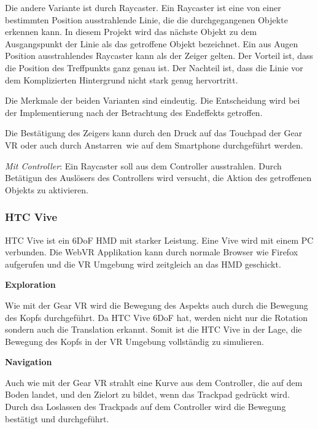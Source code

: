   Die andere Variante ist durch Raycaster. Ein Raycaster ist eine von einer bestimmten Position ausstrahlende Linie, die die durchgegangenen Objekte erkennen kann. In diesem Projekt wird das nächste Objekt zu dem Ausgangspunkt der Linie als das getroffene Objekt bezeichnet. Ein aus Augen Position ausstrahlendes Raycaster kann als der Zeiger gelten. Der Vorteil ist, dass die Position des Treffpunkts ganz genau ist. Der Nachteil ist, dass die Linie vor dem Komplizierten Hintergrund nicht stark genug hervortritt.
  
  Die Merkmale der beiden Varianten sind eindeutig. Die Entscheidung wird bei der Implementierung nach der Betrachtung des Endeffekts getroffen.
  
  Die Bestätigung des Zeigers kann durch den Druck auf das Touchpad der Gear VR oder auch durch \glqq Anstarren\grqq\ wie auf dem Smartphone durchgeführt werden.
  
  \textsl{Mit Controller}: Ein Raycaster soll aus dem Controller ausstrahlen. Durch Betätigun des Auslösers des Controllers wird versucht, die Aktion des getroffenen Objekts zu aktivieren.
  
 \subsubsection{HTC Vive}
 HTC Vive ist ein 6DoF HMD mit starker Leistung. Eine Vive wird mit einem PC verbunden. Die WebVR Applikation kann durch normale Browser wie Firefox aufgerufen und die VR Umgebung wird zeitgleich an das HMD geschickt.
 
  \textbf{Exploration}
  
  Wie mit der Gear VR wird die Bewegung des Aspekts auch durch die Bewegung des Kopfs durchgeführt. Da HTC Vive 6DoF hat, werden nicht nur die Rotation sondern auch die Translation erkannt. Somit ist die HTC Vive in der Lage, die Bewegung des Kopfs in der VR Umgebung vollständig zu simulieren.
  
  \textbf{Navigation}
  
  Auch wie mit der Gear VR strahlt eine Kurve aus dem Controller, die auf dem Boden landet, und den Zielort zu bildet, wenn das Trackpad gedrückt wird. Durch dsa Loslassen des Trackpads auf dem Controller wird die Bewegung bestätigt und durchgeführt.
  
